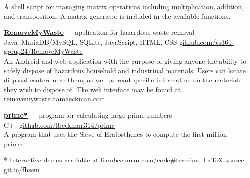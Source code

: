 \documentclass[a4paper]{article}
\begin{document}
A shell script for managing matrix operations including multiplication, addition, and transposition. A matrix generator is included in the available functions.

\textcolor{my-grey}{\dotfill}
\medbreak

\textcolor{my-blue}{\textbf{\href{https://liambeckman.com/code/matriz}{RemoveMyWaste}}} --- application for hazardous waste removal\\
\textcolor{my-grey}{Java, MariaDB/MySQL, SQLite, JavaScript, HTML, CSS \hfill \href{https://github.com/cs361-group24/RemoveMyWaste}{github.com/cs361-group24/RemoveMyWaste}}\\

An Android and web application with the purpose of giving anyone the ability to safely dispose of hazardous household and industriual materials. Users can locate disposal centers near them, as well as read specific information on the materials they wish to dispose of. The web interface may be found at \textcolor{my-blue}{\href{https://removemywaste.liambeckman.com}{removemywaste.liambeckman.com}}.

\textcolor{my-grey}{\dotfill}
\medbreak

\textcolor{my-blue}{\textbf{\href{https://liambeckman.com/code/matriz}{prime*}}} --- program for calculating large prime numbers\\
\textcolor{my-grey}{C++\hfill \href{https://github.com/lbeckman314/prime}{github.com/lbeckman314/prime}}\\

A program that uses the Sieve of Eratosthenes to compute the first million primes.

\textcolor{my-grey}{\dotfill}
\medbreak

\vfill
* Interactive demos available at \textcolor{my-blue}{\href{https://liambeckman.com/code#terminal}{liambeckman.com/code\#terminal}}
\hfill\textcolor{my-red}{\LaTeX{} source: \href{https://git.io/fhsem}{git.io/fhsem}}
\end{document}
